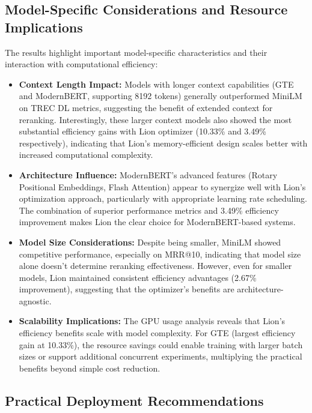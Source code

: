 \subsection{Model-Specific Considerations and Resource Implications}

The results highlight important model-specific characteristics and their interaction with computational efficiency:

\begin{itemize}
    \item \textbf{Context Length Impact:} Models with longer context capabilities (GTE and ModernBERT, supporting 8192 tokens) generally outperformed MiniLM on TREC DL metrics, suggesting the benefit of extended context for reranking. Interestingly, these larger context models also showed the most substantial efficiency gains with Lion optimizer (10.33\% and 3.49\% respectively), indicating that Lion's memory-efficient design scales better with increased computational complexity.
    
    \item \textbf{Architecture Influence:} ModernBERT's advanced features (Rotary Positional Embeddings, Flash Attention) appear to synergize well with Lion's optimization approach, particularly with appropriate learning rate scheduling. The combination of superior performance metrics and 3.49\% efficiency improvement makes Lion the clear choice for ModernBERT-based systems.
    
    \item \textbf{Model Size Considerations:} Despite being smaller, MiniLM showed competitive performance, especially on MRR@10, indicating that model size alone doesn't determine reranking effectiveness. However, even for smaller models, Lion maintained consistent efficiency advantages (2.67\% improvement), suggesting that the optimizer's benefits are architecture-agnostic.
    
    \item \textbf{Scalability Implications:} The GPU usage analysis reveals that Lion's efficiency benefits scale with model complexity. For GTE (largest efficiency gain at 10.33\%), the resource savings could enable training with larger batch sizes or support additional concurrent experiments, multiplying the practical benefits beyond simple cost reduction.
\end{itemize}

\subsection{Practical Deployment Recommendations}


